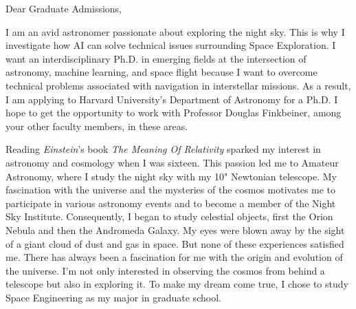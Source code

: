 \documentclass[a4,25pt]{article}
\begin{document}
\begin{large} 
Dear Graduate Admissions, \par
\vspace{-0.25cm} \quad 
I am an avid astronomer passionate about exploring the night sky. This is why I investigate how AI can solve technical issues surrounding Space Exploration. I want an interdisciplinary Ph.D. in emerging fields at the intersection of astronomy, machine learning, and space flight because I want to overcome technical problems associated with navigation in interstellar missions. As a result, I am applying to Harvard University's Department of Astronomy for a Ph.D. I hope to get the opportunity to work with Professor Douglas Finkbeiner, among your other faculty members, in these areas. \par
Reading \textit{Einstein}'s book \textit{The Meaning Of Relativity} sparked my interest in astronomy and cosmology when I was sixteen. This passion led me to Amateur Astronomy, where I study the night sky with my 10" Newtonian telescope. My fascination with the universe and the mysteries of the cosmos motivates me to participate in various astronomy events and to become a member of the Night Sky Institute. Consequently, I began to study celestial objects, first the Orion Nebula and then the Andromeda Galaxy. My eyes were blown away by the sight of a giant cloud of dust and gas in space. But none of these experiences satisfied me. There has always been a fascination for me with the origin and evolution of the universe. I'm not only interested in observing the cosmos from behind a telescope but also in exploring it. To make my dream come true, I chose to study Space Engineering as my major in graduate school.


\end{large}
\end{document}
